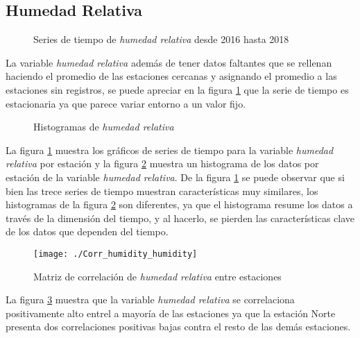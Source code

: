\subsection{Humedad Relativa}
\begin{figure}[H]
\centering
{}
\caption{Series de tiempo de {\em humedad relativa} desde 2016 hasta 2018}
\label{seriehumidity}
\end{figure}

La variable {\em humedad relativa} además de tener datos faltantes que se rellenan haciendo el promedio de las estaciones cercanas y asignando el promedio a las estaciones sin registros, se puede apreciar en la figura \ref{seriehumidity} que la serie de tiempo es estacionaria ya que parece variar entorno a un valor fijo.

\begin{figure}[H]
\centering
{}
\caption{Histogramas de {\em humedad relativa} }
\label{histhumidity}
\end{figure}

La figura \ref{seriehumidity} muestra los gráficos de series de tiempo para la variable {\em humedad relativa} por estación y la figura \ref{histhumidity} muestra un histograma de los datos por estación de la variable {\em humedad relativa}. De la figura \ref{seriehumidity} se puede observar que si bien las trece series de tiempo muestran características muy similares, los histogramas de la figura \ref{histhumidity} son diferentes, ya que el histograma resume los datos a través de la dimensión del tiempo, y al hacerlo, se pierden las características clave de los datos que dependen del tiempo.

\begin{figure}[H]
\centering
\texttt{[image: ./Corr\_humidity\_humidity]}
\caption{Matriz de correlación de {\em humedad relativa} entre estaciones }
\label{corrhumidity2}
\end{figure}

La figura \ref{corrhumidity2} muestra que la variable {\em humedad relativa} se correlaciona positivamente alto entrel a mayoría de las estaciones ya que la estación Norte presenta dos correlaciones positivas bajas contra el resto de las demás estaciones.

